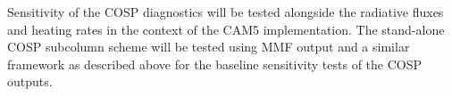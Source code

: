 \documentclass[letter]{article}
\begin{document}
Sensitivity of the COSP diagnostics will be tested alongside the radiative fluxes and heating rates in the context of the CAM5 implementation. The stand-alone COSP subcolumn scheme will be tested using MMF output and a similar framework as described above for the baseline sensitivity tests of the COSP outputs.



\end{document}
